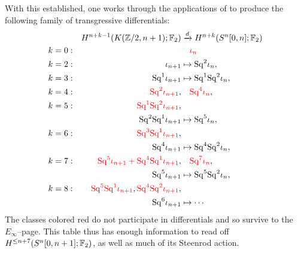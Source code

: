 \noindent
With this established, one works through the applications of  to produce the following family of transgressive differentials:
\begin{align*}
& & H^{n+k-1}(K(\mathbb Z/2, n+1); \mathbb F_2) & \xrightarrow{d} H^{n+k}(S^n[0, n]; \mathbb F_2) \\
k & = 0: &
& \quad \textcolor{red}{\iota_n} \\
k & = 2: &
\iota_{n+1} & \mapsto \mathrm{Sq}^2 \iota_n, \\
k & = 3: &
\mathrm{Sq}^1 \iota_{n+1} & \mapsto \mathrm{Sq}^1 \mathrm{Sq}^2 \iota_n, \\
k & = 4: &
\textcolor{red}{\mathrm{Sq}^2 \iota_{n+1}}, & \quad \textcolor{red}{\mathrm{Sq}^4 \iota_n}, \\
k & = 5: &
\textcolor{red}{\mathrm{Sq}^1 \mathrm{Sq}^2 \iota_{n+1}}, \\
& & \mathrm{Sq}^2 \mathrm{Sq}^1 \iota_{n+1} & \mapsto \mathrm{Sq}^5 \iota_n, \\
k & = 6: &
\textcolor{red}{\mathrm{Sq}^3 \mathrm{Sq}^1 \iota_{n+1}}, \\
& & \mathrm{Sq}^4 \iota_{n+1} & \mapsto \mathrm{Sq}^4 \mathrm{Sq}^2 \iota_n, \\
k & = 7: &
\textcolor{red}{\mathrm{Sq}^5 \iota_{n+1} + \mathrm{Sq}^4 \mathrm{Sq}^1 \iota_{n+1}}, & \quad \textcolor{red}{\mathrm{Sq}^7 \iota_n}, \\
& & \mathrm{Sq}^5 \iota_{n+1} & \mapsto \mathrm{Sq}^5 \mathrm{Sq}^2 \iota_n, \\
k & = 8: &
\textcolor{red}{\mathrm{Sq}^5 \mathrm{Sq}^1 \iota_{n+1}}, \textcolor{red}{\mathrm{Sq}^4 \mathrm{Sq}^2 \iota_{n+1}}, \\
& & \mathrm{Sq}^6 \iota_{n+1} & \mapsto \cdots
\end{align*}
The classes colored red do not participate in differentials and so survive to the $E_\infty$--page.
This table thus has enough information to read off $H^{\le n+7}(S^n[0, n+1]; \mathbb F_2)$, as well as much of its Steenrod action.

